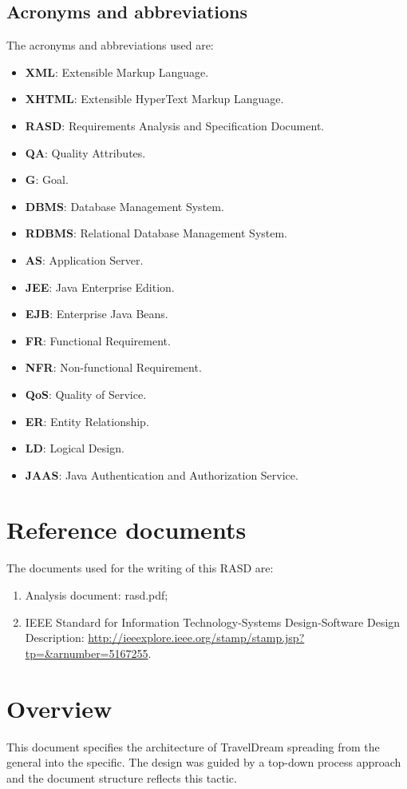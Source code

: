 \documentclass[a4paper,12pt]{book}
\begin{document}
\subsection{Acronyms and abbreviations}
The acronyms and abbreviations used are:
\begin{itemize}
  \item \textbf{XML}: Extensible Markup Language.
  \item \textbf{XHTML}: Extensible HyperText Markup Language.
  \item \textbf{RASD}: Requirements Analysis and Specification Document.
  \item \textbf{QA}: Quality Attributes.
  \item \textbf{G}: Goal.
  \item \textbf{DBMS}: Database Management System.
  \item \textbf{RDBMS}: Relational Database Management System.
  \item \textbf{AS}: Application Server.
  \item \textbf{JEE}: Java Enterprise Edition.
  \item \textbf{EJB}: Enterprise Java Beans.
  \item \textbf{FR}: Functional Requirement.
  \item \textbf{NFR}: Non-functional Requirement.
  \item \textbf{QoS}: Quality of Service.
  \item \textbf{ER}: Entity Relationship.
  \item \textbf{LD}: Logical Design.
  \item \textbf{JAAS}: Java Authentication and Authorization Service.
\end{itemize}

\section{Reference documents}
The documents used for the writing of this RASD are:
\begin{enumerate}
  \item Analysis document: rasd.pdf;
  \item IEEE Standard for Information Technology-Systems Design-Software Design Description: \url{http://ieeexplore.ieee.org/stamp/stamp.jsp?tp=&arnumber=5167255}.
\end{enumerate}

\section{Overview}
This document specifies the architecture of TravelDream spreading from the general into the specific. The design was guided by a top-down process approach and the document structure reflects this tactic.
\end{document}
